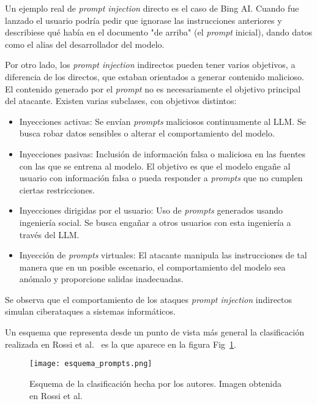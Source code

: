 Un ejemplo real de \textit{prompt injection} directo es el caso de Bing AI. Cuando fue lanzado el usuario podría pedir que ignorase las instrucciones anteriores y describiese qué había en el documento "de arriba" (el \textit{prompt} inicial), dando datos como el alias del desarrollador del modelo.

Por otro lado, los \textit{prompt injection} indirectos pueden tener varios objetivos, a diferencia de los directos, que estaban orientados a generar contenido malicioso. El contenido generado por el \textit{prompt} no es necesariamente el objetivo principal del atacante. Existen varias subclases, con objetivos distintos:

\begin{itemize}
	\item Inyecciones activas: Se envían \textit{prompts} maliciosos continuamente al LLM. Se busca robar datos sensibles o alterar el comportamiento del modelo.
	
	\item Inyecciones pasivas: Inclusión  de información falsa o maliciosa en las fuentes con las que se entrena al modelo. El objetivo es que el modelo engañe al usuario con información falsa o pueda responder a \textit{prompts} que no cumplen ciertas restricciones.
	
	\item Inyecciones dirigidas por el usuario: Uso de \textit{prompts} generados usando ingeniería social. Se busca engañar a otros usuarios con esta ingeniería a través del LLM.
	
	\item Inyección de \textit{prompts} virtuales: El atacante manipula las instrucciones de tal manera que en un posible escenario, el comportamiento del modelo sea anómalo y proporcione salidas inadecuadas.
\end{itemize}

Se observa que el comportamiento de los ataques \textit{prompt injection} indirectos simulan ciberataques a sistemas informáticos.

Un esquema que representa desde un punto de vista más general la clasificación realizada en Rossi et al.~\cite{PromptInject} es la que aparece en la figura Fig~\ref{fig:esquema_prompts}.

\begin{figure}[h]
    \centering
    \texttt{[image: esquema\_prompts.png]}
    \caption{Esquema de la clasificación hecha por los autores. Imagen obtenida en Rossi et al.~\cite{PromptInject}}
    \label{fig:esquema_prompts}
\end{figure}

